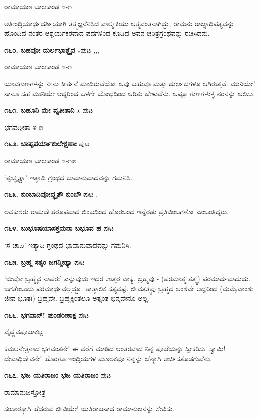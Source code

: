 {\hfill ರಾಮಾಯಣ ಬಾಲಕಾಂಡ ೪-೧

ಅತೀಂದ್ರಿಯಾರ್ಥದರ್ಶಿಯಾಗಿ ತತ್ತ್ವಜ್ಞನೆನಿಸಿದ ವಾಲ್ಮೀಕಿಯು ಆತ್ಮವಂತನಾಗಿದ್ದು, ರಾಮನು ರಾಜ್ಯಾಧಿಪತ್ಯವನ್ನು ಹೊಂದಿದ ನಂತರ ಆಶ್ಚರ್ಯಕರವಾದ ಪದಗಳಿಂದ ಕೂಡಿದ ಅವನ ಚರಿತ್ರಗ್ರಂಥವನ್ನು ರಚಿಸಿದನು.

\medskip
\noindent\textbf{೧೬೦. ಬಹವೋ ದುರ್ಲಭಾಶ್ಚೈವ} $\star$\hfill ಪುಟ \pageref{163},\pageref{194},\pageref{219},\pageref{247}

\hfill ರಾಮಾಯಣ ಬಾಲಕಾಂಡ ೪-೧

ಯಾವಗುಣಗಳನ್ನು ನೀನು ಕೀರ್ತನೆ ಮಾಡಿರುವೆಯೋ ಅವು ಬಹುವೂ ಮತ್ತು ದುರ್ಲಭಗಳೂ ಆಗಿರುತ್ತವೆ. ಮುನಿಯೇ! ನಾನೂ ಸಹ ಮುನಿಯೇ ಆದ್ದರಿಂದ ಒಳಗೇ ಬೋಧದಿಂದ ಅರಿತು ಹೇಳುವೆನು. ಅಷ್ಟೂ ಗುಣಗಳುಳ್ಳ ನರನನ್ನು ಆಲಿಸು.

\medskip
\noindent\textbf{೧೬೧. ಬಹೂನಿ ಮೇ ವ್ಯತೀತಾನಿ} $\star$ \hfill ಪುಟ \pageref{91}

\hfill ಭಗವದ್ಗೀತಾ ೪-೫

\medskip
\noindent\textbf{೧೬೨. ಬಾಷ್ಪಪರ್ಯಾಕುಲೇಕ್ಷಣಾಃ} \hfill ಪುಟ \pageref{211}

\hfill ರಾಮಾಯಣ ಬಾಲಕಾಂಡ ೪-೧೫

`ತ್ವಚ್ಛೃತ್ವಾ' ಇತ್ಯಾದಿ ಗ್ರಂಥದ ಭಾವಾನುವಾದವನ್ನು ಗಮನಿಸಿ.

\medskip
\noindent\textbf{೧೬೩. ಬಿಂಬಾದಿವೋದ್ಧೃತೌ ಬಿಂಬೌ} \hfill ಪುಟ \pageref{167},\pageref{228}

ಲವಕುಶರು ರಾಮದೇಹರೂಪವಾದ ಬಿಂಬದಿಂದ ಹೊರಬಂದ ಇನ್ನೆರಡು ಪ್ರತಿಬಿಂಬಗಳೋ ಎಂಬಂತಿದ್ದರು.

\medskip
\noindent\textbf{೧೬೪. ಬುಭೂಷಯಾಸಕ್ತಮನಾ ಬಭೂವ ಹ} \hfill ಪುಟ \pageref{211}

`ಸ ಚಾಪಿ' ಇತ್ಯಾದಿ ಗ್ರಂಥದ ಭಾವಾನುವಾದವನ್ನು ಗಮನಿಸಿ.

\medskip
\noindent\textbf{೧೬೫. ಬ್ರಹ್ಮ ಸತ್ಯಂ ಜಗನ್ಮೀಥ್ಯಾ} \hfill ಪುಟ \pageref{54}

\hfill `ಜೀವೋ ಬ್ರಹ್ಮೈವ ನಾಪರಃ' ಎನ್ನುವುದು ಇದರ ಉತ್ತರ ವಾಕ್ಯ. ಬ್ರಹ್ಮವು - (ಪರಮಾತ್ಮ ತತ್ತ್ವ) ಪರಮಾರ್ಥವಾದುದು. ಜಗತ್ತೆಂಬುದು ಪರಮಾರ್ಥವಲ್ಲದ್ದೂ. ತಾತ್ಕಾಲಿಕ ಸತ್ಯವಷ್ಟೆ. ಜೀವತತ್ತ್ವವು ಬ್ರಹ್ಮದ ಅಂಶವೇ ಆದ್ದರಿಂದ (ಮಮೈವಾಂಶಃ ಜೀವ ಭೂತಃ) ಬ್ರಹ್ಮವೇ. ಬ್ರಹ್ಮಕ್ಕಿಂತಲೂ ಅತ್ಯಂತ ಭಿನ್ನವೇನೂ ಅಲ್ಲ.

\medskip
\noindent\textbf{೧೬೬. ಭಗವಾನ್! ಪುಂಡರೀಕಾಕ್ಷ} \hfill ಪುಟ \pageref{115}

\hfill ವೈಷ್ಣವಪೂಜಾಕಲ್ಪ

ಕಮಲನೇತ್ರನಾದ ಭಗವಂತನೇ! ಈ ವರೆಗೆ ಮಾಡಿದ ಆಂತರವಾದ ನಿನ್ನ ಪೂಜೆಯನ್ನು ಸ್ವೀಕರಿಸು. ಸ್ವಾಮಿ! ದೇವಾಧಿದೇವನೇ! ಹೊರಗೂ ಇಂದ್ರಿಯಗಳ ಮೂಲಕವೂ ನಿನ್ನನ್ನು ಚೆನ್ನಾಗಿ ಅರ್ಚಿಸತೊಡಗುವೆನು.

\medskip
\noindent\textbf{೧೬೭. ಭಜ ಯತಿರಾಜಂ ಭಜ ಯತಿರಾಜಂ} \hfill ಪುಟ \pageref{46}

\hfill ರಾಮಾನುಜಸ್ತೋತ್ರ

ಸಂಸಾರಕ್ಕಾಗಿ ಹೆದರುವ ಜೀವಿಯೇ! ಯತಿರಾಜನಾದ ರಾಮಾನುಜನನ್ನು ಸೇವಿಸು.

}
